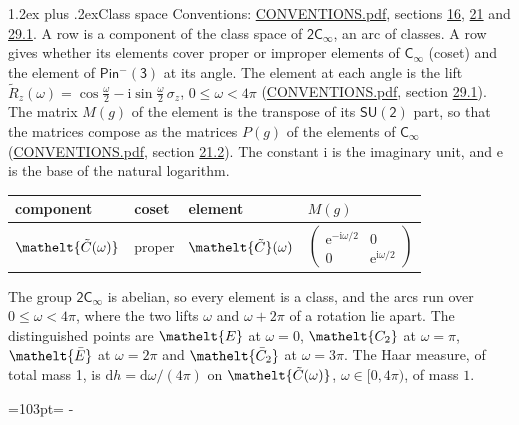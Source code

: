 \documentclass[10pt,a4paper]{article}
\makeatletter
\renewcommand\section{\@startsection{section}{1}{\z@}{-3ex plus -1ex minus -.2ex}%
  {1.2ex plus .2ex}{\normalfont\large\sffamily\bfseries\color{parttitle}}}
\newcommand{\needspace}[1]{\par\penalty-100\begingroup\dimen0=#1\relax\dimen2=\pagegoal
  \advance\dimen2-\pagetotal\ifdim\dimen0>\dimen2\relax\ifdim\dimen2>0pt\vfil\break\fi\fi
  \endgroup}
\numberwithin{equation}{section}
\newcommand{\eltfont}[1]{{\let\sigma\eltsigma\mathelt{#1}}}
\newcommand{\grp}[1]{\mathsf{#1}}
\newcommand{\cls}[1]{\eltfont{#1}}
\newcommand{\comp}[1]{\eltfont{#1}}
\newcommand{\elt}[1]{\eltfont{#1}}
\newcommand{\iunit}{\mathrm{i}}
\newcommand{\expe}{\mathrm{e}}
\newcommand{\diff}{\mathrm{d}}
\newcommand{\barred}[1]{\bar{#1}}
\newcommand{\lift}[1]{\tilde{#1}}
\newcommand{\pauli}[1]{\sigma_{#1}}
\makeatother
\begin{document}
\section{Class space}\label{s:class_space}
Conventions: \href{../../CONVENTIONS.pdf}{CONVENTIONS.pdf}, sections \href{../../../rotation/CONVENTIONS.pdf\#conv.16}{16}, \href{../../CONVENTIONS.pdf\#conv.21}{21} and \href{../../CONVENTIONS.pdf\#conv.29.1}{29.1}.
\leavevmode\label{n:head.component}A row is a component of the class space of $\grp{2C_{\infty }}$, an arc of classes. \label{n:head.coset}\label{n:head.element}A row gives whether its elements cover proper or improper elements of \href{../../../rotation/data/pdf/Cinf.pdf}{$\grp{C_{\infty}}$} (coset) and the element of $\grp{Pin^{-}(3)}$ at its angle. \label{n:angle.omega}The element at each angle is the lift $\lift{R}_z(\omega) = \cos\tfrac{\omega}{2} - \iunit\sin\tfrac{\omega}{2}\,\pauli{z}$, $0 \le \omega < 4\pi$ (\href{../../CONVENTIONS.pdf}{CONVENTIONS.pdf}, section \href{../../CONVENTIONS.pdf\#conv.29.1}{29.1}). \label{n:matrix.element.pin}The matrix $M(g)$ of the element is the transpose of its $\grp{SU(2)}$ part, so that the matrices compose as the matrices $P(g)$ of the elements of \href{../../../rotation/data/pdf/Cinf.pdf}{$\grp{C_{\infty}}$} (\href{../../CONVENTIONS.pdf}{CONVENTIONS.pdf}, section \href{../../CONVENTIONS.pdf\#conv.21.2}{21.2}).
The constant $\iunit$ is the imaginary unit, and $\expe$ is the base of the natural logarithm.
\begin{center}\begin{tabular}{@{}llll@{}}\toprule
component & coset & element & $M(g)$\\\midrule
$\comp{\lift{C}(\omega)}$ & proper & $\elt{\lift{C}}(\omega)$ & $\left(\begin{smallmatrix}\expe^{-\iunit\omega/2} & 0\\ 0 & \expe^{\iunit\omega/2}\end{smallmatrix}\right)$\\
\bottomrule\end{tabular}\end{center}
The group $\grp{2C_{\infty }}$ is abelian, so every element is a class, and the arcs run over $0 \le \omega < 4\pi$, where the two lifts $\omega$ and $\omega + 2\pi$ of a rotation lie apart.
The distinguished points are $\cls{E}$ at $\omega = 0$, $\cls{C_2}$ at $\omega = \pi$, $\cls{\barred{E}}$ at $\omega = 2\pi$ and $\cls{\barred{C}_2}$ at $\omega = 3\pi$.
\leavevmode\label{n:local.haar.h}The Haar measure, of total mass 1, is $\diff h = \diff\omega/(4\pi)$ on $\comp{\lift{C}(\omega)}$, $\omega\in\bigl[0, 4\pi\bigr)$, of mass $1$.
\needspace{103pt}
\end{document}
